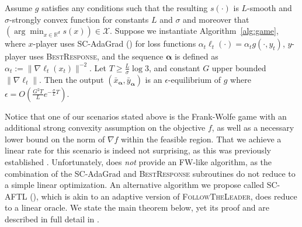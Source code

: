 \documentclass[pmlr]{jmlr} %
\def\reals{\mathbb{R}}
\def\reals{\mathbb{R}}
\def\balpha{\boldsymbol{\alpha}}
\def\FTL{\textsc{FollowTheLeader}\xspace}
\def\BR{\textsc{BestResponse}\xspace}
\newcommand{\yx}[1]{y_{#1}}
\newcommand{\XX}{\mathcal{X}}
\newcommand{\pr}[1]{\left(#1\right)}
\begin{document}
\begin{theorem}\label{thm:linear-rate}
Assume $g$ satisfies any conditions such that the resulting $s(\cdot)$ is $L$-smooth and $\sigma$-strongly convex function for constants $L$ and $\sigma$ and moreover that $(\arg\min_{x\in \reals^d} s(x)) \in \XX$. Suppose we instantiate Algorithm~\ref{alg:game}, where $x$-player uses SC-AdaGrad () for loss functions $\alpha_{t} \ell_{t}(\cdot) = \alpha_{t} g(\cdot, y_{t})$, $y$-player uses \BR, and the sequence $\balpha$ is defined as $\alpha_{t} := \| \nabla \ell_{t}(x_{t}) \|^{-2}$. Let $T \geq \frac L \sigma \log 3$, and constant $G$ upper bounded $\|\nabla \ell_{t}\|$. Then the output $(\bar x_{\balpha}, \bar y_{\balpha})$ is an $\epsilon$-equilibrium of $g$ where $\epsilon = O\pr{\frac{G^{2} T}{L}e^{-\frac{\sigma}{L}T}}$.
\end{theorem}



Notice that one of our scenarios stated above is the Frank-Wolfe game with an additional strong convexity assumption on the objective $f$, as well as a necessary lower bound on the norm of $\nabla f$ within the feasible region. That we achieve a linear rate for this scenario is indeed not surprising, as this was previously established \citep{LP66,DR70,D79}. Unfortunately,  does \emph{not} provide an FW-like algorithm, as the combination of the SC-AdaGrad and \BR subroutines do not reduce to a simple linear optimization. An alternative algorithm we propose called SC-AFTL (), which is akin to an adaptive version of \FTL, does reduce to a linear oracle. We state the main theorem below, yet its proof and  are described in full detail in . 


\end{document}
